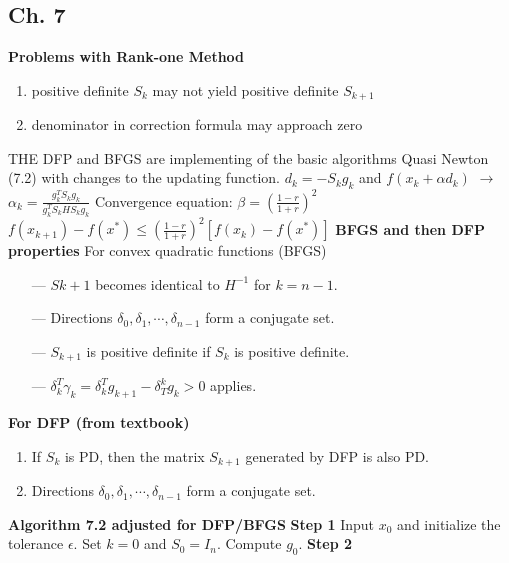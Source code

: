 \begin{multicols}{3}
\section{Ch. 7}
\textbf{Problems with Rank-one Method}
\begin{enumerate}
	\item positive definite $S_k$ may not yield positive definite $S_{k+1}$
	\item denominator in correction formula may approach zero 
\end{enumerate}  
THE DFP and BFGS are implementing of the basic algorithms Quasi Newton (7.2) with changes to the updating function. $d_k=-S_kg_k$ and $f(x_k + \alpha d_k)$  $\rightarrow$  $\alpha_k=\frac{g_k^TS_kg_k} 
{g_k^TS_kHS_kg_k}$ \newline
Convergence equation: $\beta = \left(\frac{1-r}{1+r}\right)^2$ $f(x_{k+1})-f(x^*) \leq \left(\frac{1-r}{1+r}\right)^2[f(x_k)-f(x^*)]$ \newline
\textbf{BFGS and then DFP properties} \newline
For convex quadratic functions (BFGS)
\begin{enumerate}
	\item[---] $Sk+1$ becomes identical to $H^{-1}$ for $k = n-1$.
	\item[---] Directions $\delta_0,\delta_1,\cdots,\delta_{n-1}$ form a conjugate set. 
	\item[---] $S_{k+1}$ is positive definite if $S_k$ is positive definite.
	\item[---] $\delta^T_k \gamma_k = \delta^T_k g_{k+1}-\delta_T^k g_k > 0$ applies. \newline
\end{enumerate}  
\textbf{For DFP (from textbook)} 
\begin{enumerate}
	\item If $S_k$ is PD, then 
	the matrix $S_{k+1}$ generated by DFP is also PD.
	\item Directions $\delta_0,\delta_1,\cdots,\delta_{n-1}$ form a conjugate set. \newline
\end{enumerate} 
\textbf{Algorithm 7.2 adjusted for DFP/BFGS} \newline
\textbf{Step 1} \newline
Input $x_0$  and initialize the tolerance $\epsilon$. \newline
Set $k = 0$ and $S_0 = I_n$. \newline
Compute $g_0$. \newline
\textbf{Step 2} \newline

\end{multicols}
